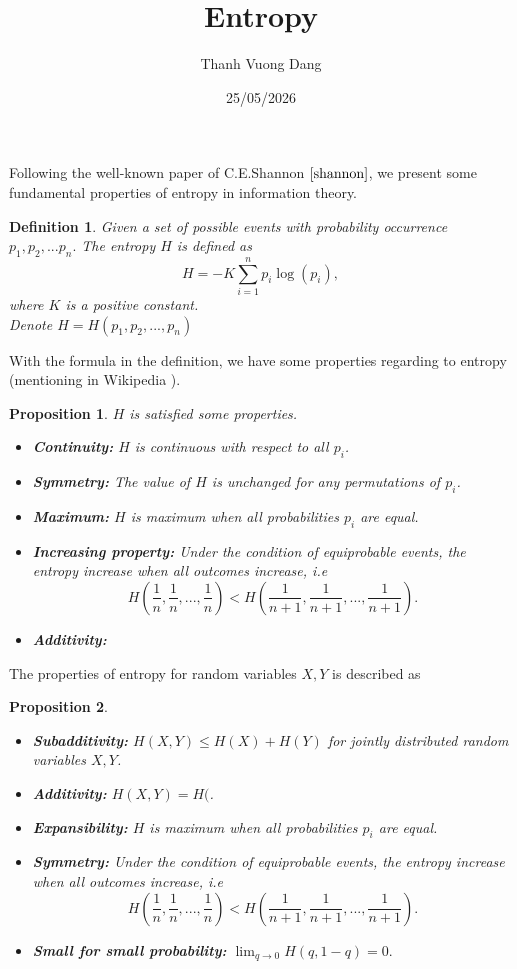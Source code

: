 \documentclass{article}
\title{Entropy}
\author{Thanh Vuong Dang}
\date{25/05/2026}
\newtheorem{definition}{Definition}
\newtheorem{proposition}{Proposition}
\begin{document}
\maketitle

Following the well-known paper of C.E.Shannon $\cite{shannon}$, we present some fundamental properties of entropy in information theory.
\begin{definition}
Given a set of possible events with probability occurrence $p_{1}, p_{2}, ... p_{n}.$ The entropy $H$ is defined as
\begin{equation}
H = -K \sum_{i= 1}^{n}p_{i}\log(p_{i}), 
\end{equation}
where $K$ is a positive constant. \\
Denote $H = H(p_{1}, p_{2}, ..., p_{n})$
\end{definition}
With the formula in the definition, we have some properties regarding to entropy (mentioning in Wikipedia \cite{wikipedia_entropy_information_theory}).  
\begin{proposition}
$H$ is satisfied some properties. 
\begin{itemize}
    \item \textbf{Continuity:} $H$ is continuous with respect to all $p_{i}$. 
    \item \textbf{Symmetry:} The value of $H$ is unchanged for any permutations of $p_{i}$.
    \item \textbf{Maximum:} $H$ is maximum when all probabilities $p_{i}$ are equal. 
    \item \textbf{Increasing property:} Under the condition of equiprobable events, the entropy increase when all outcomes increase, i.e  
    $$H\left(\frac{1}{n}, \frac{1}{n}, ..., \frac{1}{n}\right) < H\left(\frac{1}{n+1}, \frac{1}{n+1}, ..., \frac{1}{n+1}\right).$$
    \item \textbf{Additivity:}
\end{itemize}
\end{proposition}
The properties of entropy for random variables $X, Y$ is described as
\begin{proposition}
\begin{itemize}
    \item \textbf{Subadditivity:} $H(X, Y) \leq H(X) + H(Y)$ for jointly distributed random variables $X, Y$. 
    \item \textbf{Additivity:} $H(X, Y) = H($.
    \item \textbf{Expansibility:} $H$ is maximum when all probabilities $p_{i}$ are equal. 
    \item \textbf{Symmetry:} Under the condition of equiprobable events, the entropy increase when all outcomes increase, i.e  
    $$H\left(\frac{1}{n}, \frac{1}{n}, ..., \frac{1}{n}\right) < H\left(\frac{1}{n+1}, \frac{1}{n+1}, ..., \frac{1}{n+1}\right).$$
    \item \textbf{Small for small probability:} $\lim_{q \to 0}H(q,1-q) = 0.$
\end{itemize}
\end{proposition}



\end{document}
